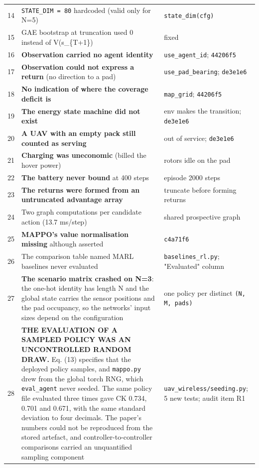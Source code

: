 \documentclass[11pt,a4paper]{article}
\begin{document}
\begin{longtable}{@{}>{\raggedleft\arraybackslash}p{0.7cm}>{\raggedright\arraybackslash}p{6.1cm}>{\raggedright\arraybackslash}p{8.55cm}@{}}
\rowcolor{uavzebra}
\textcolor{uavmuted}{14} & \texttt{STATE\_DIM = 80} hardcoded (valid only for N=5) & \texttt{state\_dim(cfg)} \\
\textcolor{uavmuted}{15} & GAE bootstrap at truncation used 0 instead of V(s\_\{T+1\}) & fixed \\
\rowcolor{uavzebra}
\textcolor{uavmuted}{16} & \textbf{Observation carried no agent identity} & \texttt{use\_agent\_id}; \texttt{44206f5} \\
\textcolor{uavmuted}{17} & \textbf{Observation could not express a return} (no direction to a pad) & \texttt{use\_pad\_bearing}; \texttt{de3e1e6} \\
\rowcolor{uavzebra}
\textcolor{uavmuted}{18} & \textbf{No indication of where the coverage deficit is} & \texttt{map\_grid}; \texttt{44206f5} \\
\textcolor{uavmuted}{19} & \textbf{The energy state machine did not exist} & env makes the transition; \texttt{de3e1e6} \\
\rowcolor{uavzebra}
\textcolor{uavmuted}{20} & \textbf{A UAV with an empty pack still counted as serving} & out of service; \texttt{de3e1e6} \\
\textcolor{uavmuted}{21} & \textbf{Charging was uneconomic} (billed the hover power) & rotors idle on the pad \\
\rowcolor{uavzebra}
\textcolor{uavmuted}{22} & \textbf{The battery never bound} at 400 steps & episode 2000 steps \\
\textcolor{uavmuted}{23} & \textbf{The returns were formed from an untruncated advantage array} & truncate before forming returns \\
\rowcolor{uavzebra}
\textcolor{uavmuted}{24} & Two graph computations per candidate action (13.7 ms/step) & shared prospective graph \\
\textcolor{uavmuted}{25} & \textbf{MAPPO's value normalisation missing} although asserted & \texttt{c4a71f6} \\
\rowcolor{uavzebra}
\textcolor{uavmuted}{26} & The comparison table named MARL baselines never evaluated & \texttt{baselines\_rl.py}; "Evaluated" column \\
\textcolor{uavmuted}{27} & \textbf{The scenario matrix crashed on N=3}: the one-hot identity has length N and the global state carries the sensor positions and the pad occupancy, so the networks' input sizes depend on the configuration & one policy per distinct \texttt{(N, M, pads)} \\
\rowcolor{uavzebra}
\textcolor{uavmuted}{28} & \textbf{THE EVALUATION OF A SAMPLED POLICY WAS AN UNCONTROLLED RANDOM DRAW.} Eq. (13) specifies that the deployed policy samples, and \texttt{mappo.py} drew from the global torch RNG, which \texttt{eval\_agent} never seeded. The same policy file evaluated three times gave CK 0.734, 0.701 and 0.671, with the same standard deviation to four decimals. The paper's numbers could not be reproduced from the stored artefact, and controller-to-controller comparisons carried an unquantified sampling component & \texttt{uav\_wireless/\allowbreak{}seeding.py}; 5 new tests; audit item R1 \\

\end{longtable}
\end{document}
